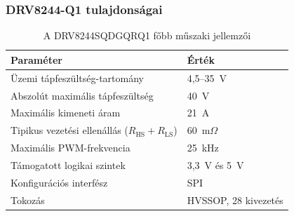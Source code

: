 \subsubsection{DRV8244-Q1 tulajdonságai}
\begin{table}[H]
    \centering
    \caption{A DRV8244SQDGQRQ1 főbb műszaki jellemzői
    \cite[4.~o., 1.]{drv8244}}
    \label{tab:drv8244-parameterek}
    \renewcommand{\arraystretch}{1.2}
    \begin{tabular}{|l|l|}
        \hline
        \rowcolor{blue!15}
        \textbf{Paraméter} & \textbf{Érték} \\
        \hline
        Üzemi tápfeszültség-tartomány & 4,5--35~V \\
        \hline
        Abszolút maximális tápfeszültség & 40~V \\
        \hline
        Maximális kimeneti áram & 21~A \\
        \hline
        Tipikus vezetési ellenállás
        ($R_\mathrm{HS}+R_\mathrm{LS}$) & 60~m$\Omega$ \\
        \hline
        Maximális PWM-frekvencia & 25~kHz \\
        \hline
        Támogatott logikai szintek & 3,3~V és 5~V \\
        \hline
        Konfigurációs interfész & SPI \\
        \hline
        Tokozás & HVSSOP, 28 kivezetés \\
        \hline
    \end{tabular}
\end{table}




